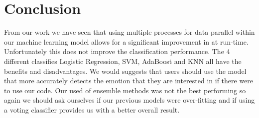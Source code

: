 \section{Conclusion}
\label{sec:conclusion}
From our work we have seen that using multiple processes
for data parallel within our machine learning model allows for
a significant improvement in at run-time.
Unfortunately this does not improve the classification performance.
The 4 different classifies Logistic Regression,
SVM, AdaBoost and KNN
all have the benefits and disadvantages.
We would suggests that users should use the model that more accurately detects
the emotion that they are interested in if there were to use our code.
Our used of ensemble methods was not the best performing so again we should
ask ourselves if our previous models were over-fitting and if using a voting
classifier provides us with a better overall result.
